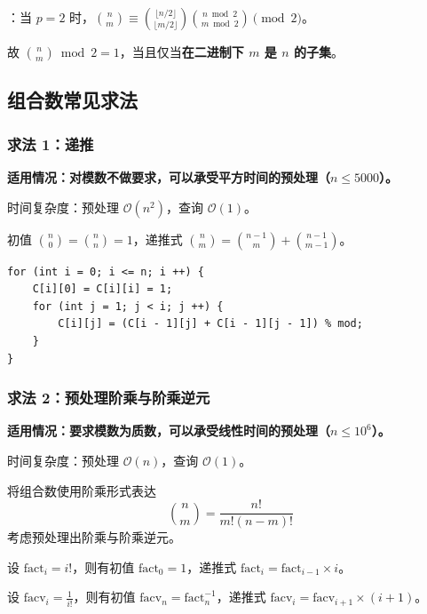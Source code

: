 ：当 $p = 2$ 时，$\binom{n}{m} \equiv \binom{\lfloor n / 2 \rfloor}{\lfloor m / 2 \rfloor}\binom{n \bmod 2}{m \bmod 2} \pmod 2$。

故 $\binom{n}{m} \bmod 2 = 1$，当且仅当\textbf{在二进制下 $m$ 是 $n$ 的子集}。

\subsection{组合数常见求法}

\subsubsection{求法 1：递推}

\begin{quoteblock}
\textbf{适用情况：对模数不做要求，可以承受平方时间的预处理（$n \leq 5000$）。}

时间复杂度：预处理 $\mathcal{O}(n^2)$，查询 $\mathcal{O}(1)$。
\end{quoteblock}

初值 $\binom{n}{0} = \binom{n}{n} = 1$，递推式 $\binom{n}{m} = \binom{n - 1}{m} + \binom{n - 1}{m - 1}$。

\begin{verbatim}
for (int i = 0; i <= n; i ++) {
    C[i][0] = C[i][i] = 1;
    for (int j = 1; j < i; j ++) {
        C[i][j] = (C[i - 1][j] + C[i - 1][j - 1]) % mod;
    }
}
\end{verbatim}

\subsubsection{求法 2：预处理阶乘与阶乘逆元}

\begin{quoteblock}
\textbf{适用情况：要求模数为质数，可以承受线性时间的预处理（$n \leq 10^6$）。}

时间复杂度：预处理 $\mathcal{O}(n)$，查询 $\mathcal{O}(1)$。
\end{quoteblock}

将组合数使用阶乘形式表达
\[
\binom{n}{m} = \frac{n!}{m!(n - m)!}
\]
考虑预处理出阶乘与阶乘逆元。

设 $\mathrm{fact}_i = i!$，则有初值 $\mathrm{fact}_0 = 1$，递推式 $\mathrm{fact}_i =\mathrm{fact}_{i - 1} \times i$。

设 $\mathrm{facv}_i = \frac{1}{i!}$，则有初值 $\mathrm{facv}_n = \mathrm{fact}_n^{-1}$，递推式 $\mathrm{facv}_i = \mathrm{facv}_{i + 1} \times(i + 1)$。

